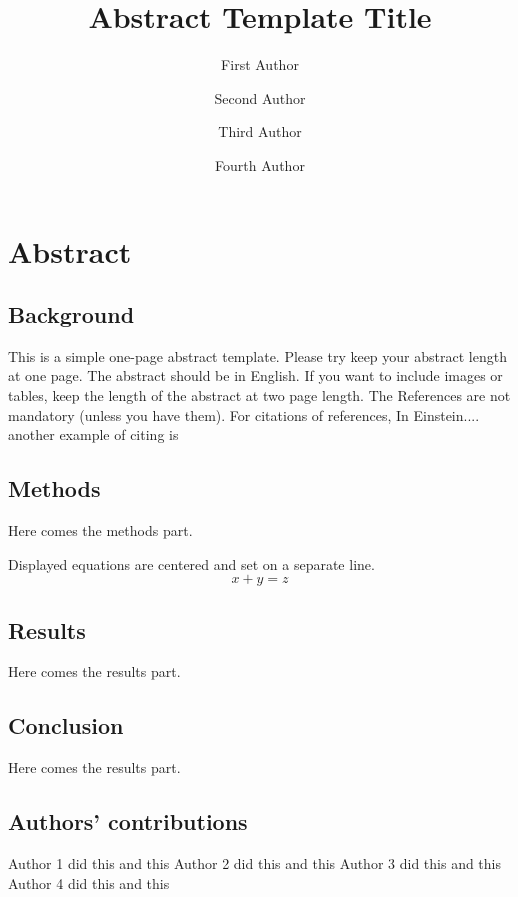 \documentclass[runningheads]{llncs}
\begin{document}
%
\title{Abstract Template Title}
%
%
\author{First Author \and
Second Author \and
Third Author \and 
Fourth Author}
%
%
%
\maketitle              %
%
%
%
\section*{Abstract}
\subsection*{Background}
This is a simple  one-page abstract template. Please try keep your abstract length at one page.  The abstract should be in English. If you want to include images or tables, keep the length of the abstract at two page length. The References are not mandatory (unless you have them). For citations of references, 
In \cite{einstein} Einstein....
another example of citing is \cite{gervain2013prosody}

%

\subsection*{Methods}
Here comes the methods part.

\noindent Displayed equations are centered and set on a separate
line.
\begin{equation}
x + y = z
\end{equation}

\subsection*{Results}

Here comes the results part.

\subsection*{Conclusion}
Here comes the results part.


\subsection*{Authors' contributions}
Author 1 did this and this
Author 2 did this and this
Author 3 did this and this
Author 4 did this and this
%
%
%


%
\end{document}
